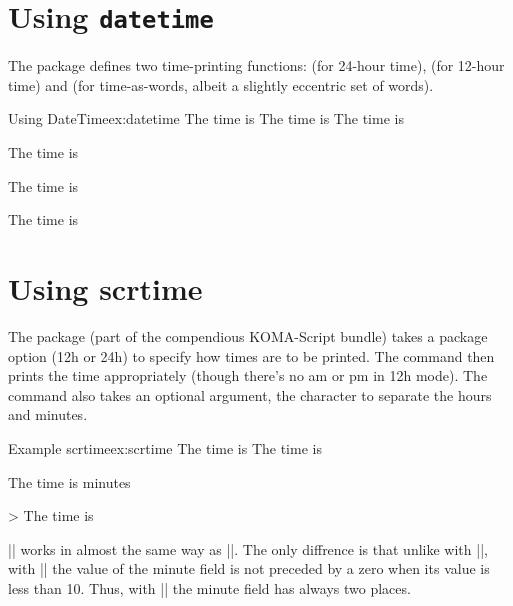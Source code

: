 \section*{Using \protect\texttt{datetime}}

The  package defines two time-printing functions: \cmd{\xxivtime} (for 24-hour time), \cmd{\ampmtime} (for 12-hour time) and \cmd{\oclock} (for time-as-words, albeit a slightly eccentric set of words).


\begin{texexample}{Using DateTime}{ex:datetime}
The time is \xxivtime
The time is \ampmtime
The time is \oclock

The time is \xxivtime

The time is \ampmtime

The time is \oclock
\end{texexample}


\section{Using scrtime}

The  package (part of the compendious KOMA-Script bundle) takes a package option (12h or 24h) to specify how times are to be printed. The command \cmd{\thistime} then prints the time appropriately (though there's no am or pm in 12h mode). The \cmd{\thistime} command also takes an optional argument, the character to separate the hours and minutes.


\begin{texexample}{Example scrtime}{ex:scrtime}
The time is \thistime
The time is \thistime[h]
\end{texexample}

\label{datesend}


The time is \thistime[ hours ] minutes 

{> The time is \thistime*[:] } 

|\thistime*| works in almost the same way as |\thistime|. The only
diffrence is that unlike with |\thistime|, with |\thistime*| the value of
the minute field is not preceded by a zero when its value is less than 10.
Thus, with |\thistime| the minute field has always two places.



